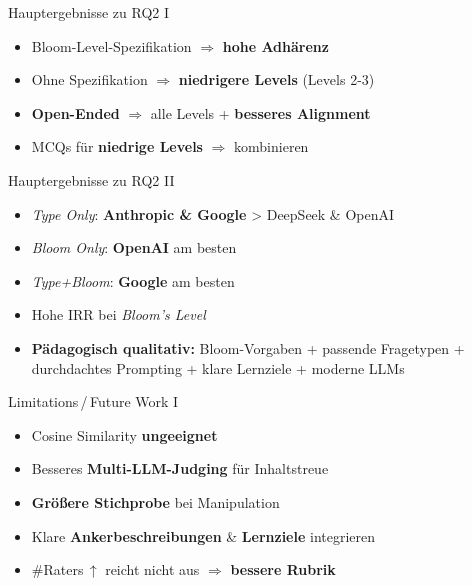 \documentclass[usenames, dvipsnames, aspectratio=32]{beamer}
\begin{document}
\begin{frame}{Hauptergebnisse zu RQ2 I}
    \begin{itemize}
        \item Bloom-Level-Spezifikation $\Rightarrow$ \textbf{hohe Adhärenz}
        \item Ohne Spezifikation $\Rightarrow$ \textbf{niedrigere Levels} (Levels 2-3)
        \item \textbf{Open-Ended} $\Rightarrow$ alle Levels + \textbf{besseres Alignment}
        \item MCQs für \textbf{niedrige Levels} $\Rightarrow$ kombinieren
    \end{itemize}
\end{frame}

\begin{frame}{Hauptergebnisse zu RQ2 II}
    \begin{itemize}
        \item \textit{Type Only}: \textbf{Anthropic \& Google} > DeepSeek \& OpenAI
        \item \textit{Bloom Only}: \textbf{OpenAI} am besten
        \item \textit{Type+Bloom}: \textbf{Google} am besten
        \item Hohe IRR bei \textit{Bloom's Level}
        \item \textbf{Pädagogisch qualitativ:} Bloom-Vorgaben + passende Fragetypen + durchdachtes Prompting + klare Lernziele + moderne LLMs
    \end{itemize}
\end{frame}

\begin{frame}{Limitations\,/\,Future Work I}
    \begin{itemize}
        \item Cosine Similarity \textbf{ungeeignet} 
        \item Besseres \textbf{Multi-LLM-Judging} für Inhaltstreue 
        \item \textbf{Größere Stichprobe} bei Manipulation
        \item Klare \textbf{Ankerbeschreibungen} \& \textbf{Lernziele} integrieren 
        \item \#Raters\,$\uparrow$ reicht nicht aus $\Rightarrow$ \textbf{bessere Rubrik}
    \end{itemize}
\end{frame}
\end{document}
